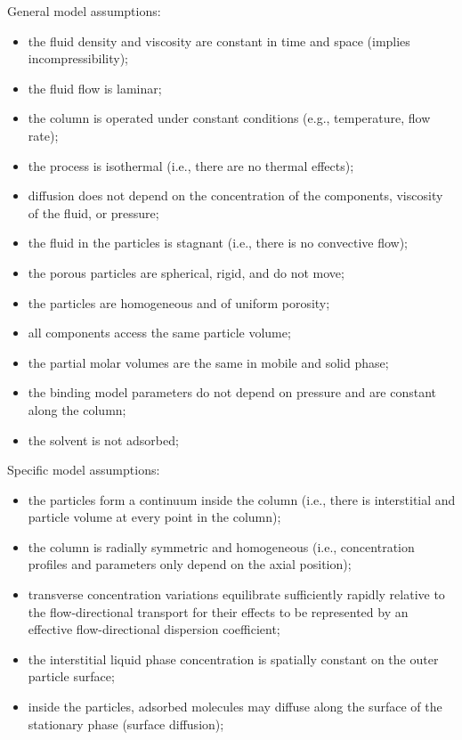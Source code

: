 \documentclass{article}
\begin{document}
General model assumptions:
\begin{itemize}
    \item the fluid density and viscosity are constant in time and space (implies incompressibility);
    \item the fluid flow is laminar;
    \item the column is operated under constant conditions (e.g., temperature, flow rate);
    \item the process is isothermal (i.e., there are no thermal effects);
    \item diffusion does not depend on the concentration of the components, viscosity of the fluid, or pressure;
    \item the fluid in the particles is stagnant (i.e., there is no convective flow);
    \item the porous particles are spherical, rigid, and do not move;
    \item the particles are homogeneous and of uniform porosity;
    \item all components access the same particle volume;
    \item the partial molar volumes are the same in mobile and solid phase;
    \item the binding model parameters do not depend on pressure and are constant along the column;
    \item the solvent is not adsorbed;
\end{itemize}

Specific model assumptions:
\begin{itemize}
    \item the particles form a continuum inside the column (i.e., there is interstitial and particle volume at every point in the column);
    \item the column is radially symmetric and homogeneous (i.e., concentration profiles and parameters only depend on the axial position);
    \item transverse concentration variations equilibrate sufficiently rapidly relative to the flow-directional transport for their effects to be represented by an effective flow-directional dispersion coefficient;
    \item the interstitial liquid phase concentration is spatially constant on the outer particle surface;
    \item inside the particles, adsorbed molecules may diffuse along the surface of the stationary phase (surface diffusion);
\end{itemize}
\end{document}
